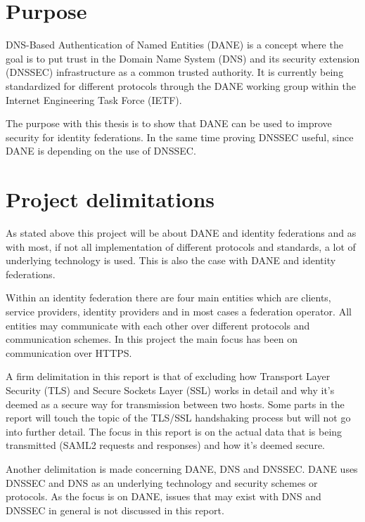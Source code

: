 \section{Purpose}
DNS-Based Authentication of Named Entities (DANE) \cite{rfc:6394,rfc:draft-dane,rfc:draft-smime} is a concept where the goal is to put trust in the Domain Name System (DNS) and its security extension (DNSSEC) \cite{rfc:4033,rfc:4034,rfc:4035,rfc:5011} infrastructure as a common trusted authority.
It is currently being standardized for different protocols through the DANE working group within the Internet Engineering Task Force (IETF).

The purpose with this thesis is to show that DANE can be used to improve security for identity federations.
In the same time proving DNSSEC useful, since DANE is depending on the use of DNSSEC.

\section{Project delimitations}
As stated above this project will be about DANE and identity federations and as with most, if not all implementation of different protocols and standards, a lot of underlying technology is used.
This is also the case with DANE and identity federations.

Within an identity federation there are four main entities which are clients, service providers, identity providers and in most cases a federation operator.
All entities may communicate with each other over different protocols and communication schemes.
In this project the main focus has been on communication over HTTPS.

A firm delimitation in this report is that of excluding how Transport Layer Security (TLS) and Secure Sockets Layer (SSL) works in detail and why it's deemed as a secure way for transmission between two hosts.
Some parts in the report will touch the topic of the TLS/SSL handshaking process but will not go into further detail.
The focus in this report is on the actual data that is being transmitted (SAML2 requests and responses) and how it's deemed secure. 

Another delimitation is made concerning DANE, DNS and DNSSEC.
DANE uses DNSSEC and DNS as an underlying technology and security schemes or protocols.
As the focus is on DANE, issues that may exist with DNS and DNSSEC in general is not discussed in this report.




